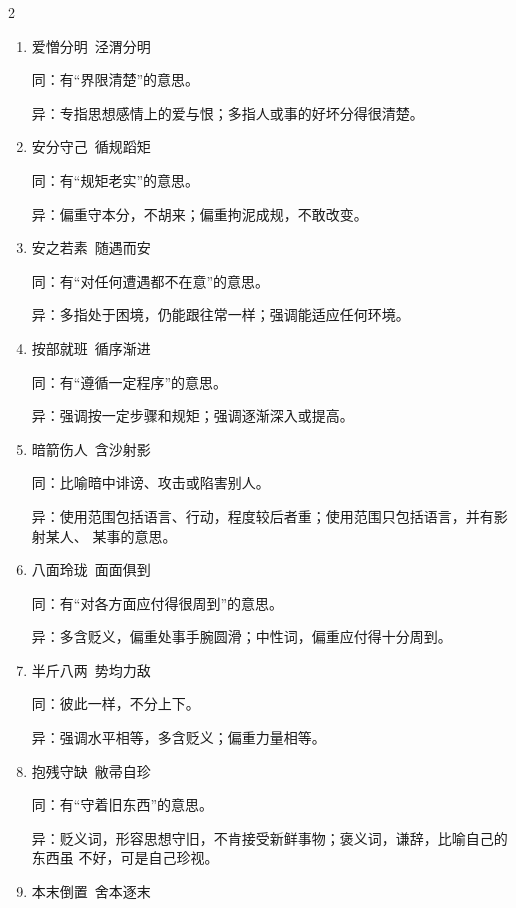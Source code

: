 \documentclass[final,oneside]{ctexbook}
\begin{document}
\begin{multicols}{2}
  \begin{enumerate}
    \item 爱憎分明~泾渭分明

      同：有“界限清楚”的意思。

      异：专指思想感情上的爱与恨；多指人或事的好坏分得很清楚。

    \item 安分守己~循规蹈矩

      同：有“规矩老实”的意思。

      异：偏重守本分，不胡来；偏重拘泥成规，不敢改变。

    \item 安之若素~随遇而安

      同：有“对任何遭遇都不在意”的意思。

      异：多指处于困境，仍能跟往常一样；强调能适应任何环境。

    \item 按部就班~循序渐进

      同：有“遵循一定程序”的意思。

      异：强调按一定步骤和规矩；强调逐渐深入或提高。

    \item 暗箭伤人~含沙射影

      同：比喻暗中诽谤、攻击或陷害别人。

      异：使用范围包括语言、行动，程度较后者重；使用范围只包括语言，并有影射某人、
      某事的意思。

    \item 八面玲珑~面面俱到

      同：有“对各方面应付得很周到”的意思。

      异：多含贬义，偏重处事手腕圆滑；中性词，偏重应付得十分周到。

    \item 半斤八两~势均力敌

      同：彼此一样，不分上下。

      异：强调水平相等，多含贬义；偏重力量相等。

    \item 抱残守缺~敝帚自珍

      同：有“守着旧东西”的意思。

      异：贬义词，形容思想守旧，不肯接受新鲜事物；褒义词，谦辞，比喻自己的东西虽
      不好，可是自己珍视。

    \item 本末倒置~舍本逐末


\end{enumerate}
\end{multicols}
\end{document}
